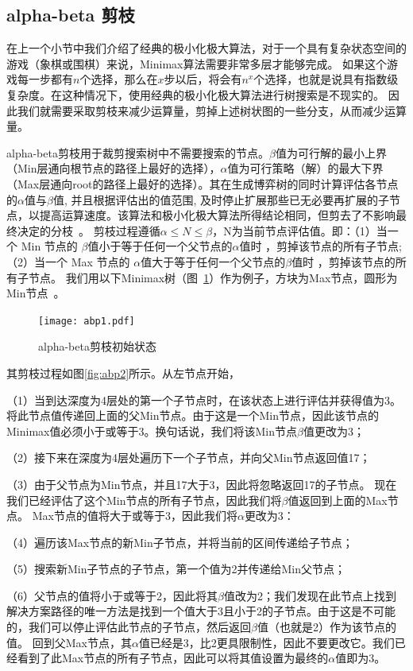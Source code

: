\subsection{alpha-beta 剪枝}
在上一个小节中我们介绍了经典的极小化极大算法，对于一个具有复杂状态空间的游戏（象棋或围棋）来说，Minimax算法需要非常多层才能够完成。
如果这个游戏每一步都有$n$个选择，那么在$x$步以后，将会有$n^x$个选择，也就是说具有指数级复杂度。在这种情况下，使用经典的极小化极大算法进行树搜索是不现实的。
因此我们就需要采取剪枝来减少运算量，剪掉上述树状图的一些分支，从而减少运算量。

alpha-beta剪枝用于裁剪搜索树中不需要搜索的节点。$\beta$值为可行解的最小上界（Min层通向根节点的路径上最好的选择），$\alpha$值为可行策略（解）的最大下界（Max层通向root的路径上最好的选择）。其在生成博弈树的同时计算评估各节点的$\alpha$值与$\beta$值, 并且根据评估出的值范围, 及时停止扩展那些已无必要再扩展的子节点，以提高运算速度。该算法和极小化极大算法所得结论相同，但剪去了不影响最终决定的分枝~\cite{russell2010artificial}。
剪枝过程遵循$\alpha \le N \le \beta$，N为当前节点评估值。即：（1）当一个 Min 节点的 $\beta$值小于等于任何一个父节点的$\alpha$值时 ，剪掉该节点的所有子节点;（2）当一个 Max 节点的 $\alpha$值大于等于任何一个父节点的$\beta$值时 ，剪掉该节点的所有子节点。
我们用以下Minimax树（图~\ref{fig:abp}）作为例子，方块为Max节点，圆形为Min节点~\cite{russell2010artificial}。
\begin{figure}[htb]
    \centering
    \texttt{[image: abp1.pdf]}
    \caption[abp]{%
    alpha-beta剪枝初始状态~\cite{russell2010artificial}%
      }
    \label{fig:abp}
  \end{figure}

其剪枝过程如图\ref{fig:abp2}所示。从左节点开始，

（1）当到达深度为4层处的第一个子节点时，在该状态上进行评估并获得值为3。将此节点值传递回上面的父Min节点。由于这是一个Min节点，因此该节点的Minimax值必须小于或等于3。换句话说，我们将该Min节点$\beta$值更改为3；

（2）接下来在深度为4层处遍历下一个子节点，并向父Min节点返回值17；

（3）由于父节点为Min节点，并且17大于3，因此将忽略返回17的子节点。 现在我们已经评估了这个Min节点的所有子节点，因此我们将$\beta$值返回到上面的Max节点。 Max节点的值将大于或等于3，因此我们将$\alpha$更改为3：

（4）遍历该Max节点的新Min子节点，并将当前的区间传递给子节点；

（5）搜索新Min子节点的子节点，第一个值为2并传递给Min父节点；

（6）父节点的值将小于或等于2，因此将其$\beta$值改为2；我们发现在此节点上找到解决方案路径的唯一方法是找到一个值大于3且小于2的子节点。由于这是不可能的，我们可以停止评估此节点的子节点，然后返回$\beta$值（也就是2）作为该节点的值。
回到父Max节点，其$\alpha$值已经是3，比2更具限制性，因此不要更改它。我们已经看到了此Max节点的所有子节点，因此可以将其值设置为最终的$\alpha$值即为3。

